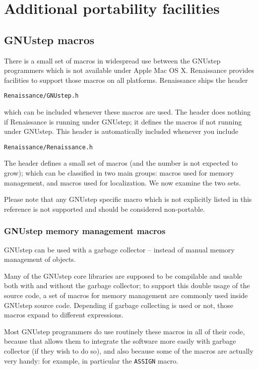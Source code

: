 \chapter{Additional portability facilities}

\section{GNUstep macros}
There is a small set of macros in widespread use between the GNUstep
programmers which is not available under Apple Mac OS X.  Renaissance
provides facilities to support those macros on all platforms.
Renaissance ships the header
\begin{verbatim}
Renaissance/GNUstep.h
\end{verbatim}
which can be included whenever these macros are used.  The header does
nothing if Renaissance is running under GNUstep; it defines the macros
if not running under GNUstep.  This header is automatically included
whenever you include
\begin{verbatim}
Renaissance/Renaissance.h
\end{verbatim}
The header defines a small set of macros (and the number is not
expected to grow); which can be classified in two main groups: macros
used for memory management, and macros used for localization.  We now
examine the two sets.

Please note that any GNUstep specific macro which is not explicitly
listed in this reference is not supported and should be considered
non-portable.

\subsection{GNUstep memory management macros}
GNUstep can be used with a garbage collector -- instead of manual
memory management of objects.

Many of the GNUstep core libraries are supposed to be compilable and
usable both with and without the garbage collector; to support this
double usage of the source code, a set of macros for memory management
are commonly used inside GNUstep source code.  Depending if garbage
collecting is used or not, those macros expand to different
expressions.

Most GNUstep programmers do use routinely these macros in all of their
code, because that allows them to integrate the software more easily
with garbage collector (if they wish to do so), and also because some
of the macros are actually very handy: for example, in particular the
\texttt{ASSIGN} macro.

